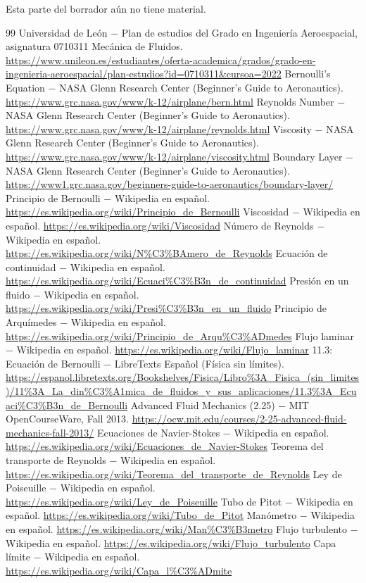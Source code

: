 \documentclass{book}
\begin{document}
\noindent Esta parte del borrador aún no tiene material.
\backmatter
\begin{thebibliography}{99}
 Universidad de León \(-\) Plan de estudios del Grado en Ingeniería Aeroespacial, asignatura 0710311 Mecánica de Fluidos. \url{https://www.unileon.es/estudiantes/oferta-academica/grados/grado-en-ingenieria-aeroespacial/plan-estudios?id=0710311&cursoa=2022}
 Bernoulli's Equation \(-\) NASA Glenn Research Center (Beginner's Guide to Aeronautics). \url{https://www.grc.nasa.gov/www/k-12/airplane/bern.html}
 Reynolds Number \(-\) NASA Glenn Research Center (Beginner's Guide to Aeronautics). \url{https://www.grc.nasa.gov/www/k-12/airplane/reynolds.html}
 Viscosity \(-\) NASA Glenn Research Center (Beginner's Guide to Aeronautics). \url{https://www.grc.nasa.gov/www/k-12/airplane/viscosity.html}
 Boundary Layer \(-\) NASA Glenn Research Center (Beginner's Guide to Aeronautics). \url{https://www1.grc.nasa.gov/beginners-guide-to-aeronautics/boundary-layer/}
 Principio de Bernoulli \(-\) Wikipedia en español. \url{https://es.wikipedia.org/wiki/Principio_de_Bernoulli}
 Viscosidad \(-\) Wikipedia en español. \url{https://es.wikipedia.org/wiki/Viscosidad}
 Número de Reynolds \(-\) Wikipedia en español. \url{https://es.wikipedia.org/wiki/N%C3%BAmero_de_Reynolds}
 Ecuación de continuidad \(-\) Wikipedia en español. \url{https://es.wikipedia.org/wiki/Ecuaci%C3%B3n_de_continuidad}
 Presión en un fluido \(-\) Wikipedia en español. \url{https://es.wikipedia.org/wiki/Presi%C3%B3n_en_un_fluido}
 Principio de Arquímedes \(-\) Wikipedia en español. \url{https://es.wikipedia.org/wiki/Principio_de_Arqu%C3%ADmedes}
 Flujo laminar \(-\) Wikipedia en español. \url{https://es.wikipedia.org/wiki/Flujo_laminar}
 11.3: Ecuación de Bernoulli \(-\) LibreTexts Español (Física sin límites). \url{https://espanol.libretexts.org/Bookshelves/Fisica/Libro%3A_Fisica_(sin_limites)/11%3A_La_din%C3%A1mica_de_fluidos_y_sus_aplicaciones/11.3%3A_Ecuaci%C3%B3n_de_Bernoulli}
 Advanced Fluid Mechanics (2.25) \(-\) MIT OpenCourseWare, Fall 2013. \url{https://ocw.mit.edu/courses/2-25-advanced-fluid-mechanics-fall-2013/}
 Ecuaciones de Navier-Stokes \(-\) Wikipedia en español. \url{https://es.wikipedia.org/wiki/Ecuaciones_de_Navier-Stokes}
 Teorema del transporte de Reynolds \(-\) Wikipedia en español. \url{https://es.wikipedia.org/wiki/Teorema_del_transporte_de_Reynolds}
 Ley de Poiseuille \(-\) Wikipedia en español. \url{https://es.wikipedia.org/wiki/Ley_de_Poiseuille}
 Tubo de Pitot \(-\) Wikipedia en español. \url{https://es.wikipedia.org/wiki/Tubo_de_Pitot}
 Manómetro \(-\) Wikipedia en español. \url{https://es.wikipedia.org/wiki/Man%C3%B3metro}
 Flujo turbulento \(-\) Wikipedia en español. \url{https://es.wikipedia.org/wiki/Flujo_turbulento}
 Capa límite \(-\) Wikipedia en español. \url{https://es.wikipedia.org/wiki/Capa_l%C3%ADmite}
\end{thebibliography}
\end{document}
